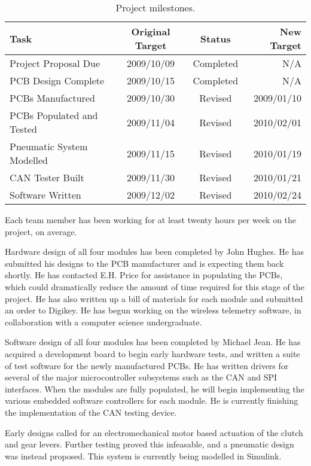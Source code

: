 \documentclass[12pt]{report}
\begin{document}
\begin{table}[H]
  \caption{Project milestones.}
  \label{table:milestones}
  \centering
  \begin{tabular}{|l|c|c|r|}
    \hline
    Task & Original Target & Status & New Target\\
    \hline
    Project Proposal Due & 2009/10/09 & Completed & N/A \\
    PCB Design Complete & 2009/10/15 & Completed & N/A  \\
    PCBs Manufactured & 2009/10/30 & Revised & 2009/01/10 \\
    PCBs Populated and Tested & 2009/11/04 & Revised & 2010/02/01 \\
    Pneumatic System Modelled & 2009/11/15 & Revised & 2010/01/19 \\
    CAN Tester Built & 2009/11/30 & Revised & 2010/01/21 \\
    Software Written & 2009/12/02 & Revised & 2010/02/24 \\
    \hline
  \end{tabular}
\end{table}

Each team member has been working for at least twenty hours per week on the project, on average.

Hardware design of all four modules has been completed by John Hughes. He has submitted his designs to the PCB manufacturer and is expecting them back shortly. He has contacted E.H. Price for assistance in populating the PCBs, which could dramatically reduce the amount of time required for this stage of the project. He has also written up a bill of materials for each module and submitted an order to Digikey. He has begun working on the wireless telemetry software, in collaboration with a computer science undergraduate. 

Software design of all four modules has been completed by Michael Jean. He has acquired a development board to begin early hardware tests, and written a suite of test software for the newly manufactured PCBs. He has written drivers for several of the major microcontroller subsystems such as the CAN and SPI interfaces. When the modules are fully populated, he will begin implementing the various embedded software controllers for each module. He is currently finishing the implementation of the CAN testing device.

Early designs called for an electromechanical motor based actuation of the clutch and gear levers. Further testing proved this infeasable, and a pneumatic design was instead proposed. This system is currently being modelled in Simulink. 
\end{document}
